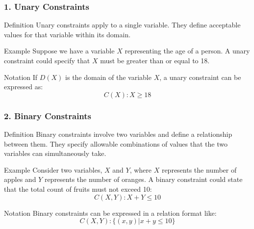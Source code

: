 \documentclass[aspectratio=169]{beamer}
\begin{document}
\begin{frame}[fragile]
    \frametitle{1. Unary Constraints}
    \begin{block}{Definition}
        Unary constraints apply to a single variable. They define acceptable values for that variable within its domain.
    \end{block}

    \begin{block}{Example}
        Suppose we have a variable \(X\) representing the age of a person. A unary constraint could specify that \(X\) must be greater than or equal to 18.
    \end{block}

    \begin{block}{Notation}
        If \(D(X)\) is the domain of the variable \(X\), a unary constraint can be expressed as:
        \[
        C(X) : X \geq 18
        \]
    \end{block}
\end{frame}

\begin{frame}[fragile]
    \frametitle{2. Binary Constraints}
    \begin{block}{Definition}
        Binary constraints involve two variables and define a relationship between them. They specify allowable combinations of values that the two variables can simultaneously take.
    \end{block}

    \begin{block}{Example}
        Consider two variables, \(X\) and \(Y\), where \(X\) represents the number of apples and \(Y\) represents the number of oranges. A binary constraint could state that the total count of fruits must not exceed 10:
        \[
        C(X, Y) : X + Y \leq 10
        \]
    \end{block}

    \begin{block}{Notation}
        Binary constraints can be expressed in a relation format like:
        \[
        C(X, Y) : \{(x, y) | x + y \leq 10\}
        \]
    \end{block}
\end{frame}
\end{document}
